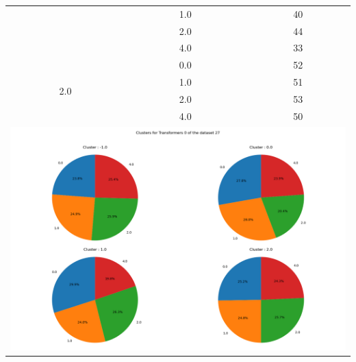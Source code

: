 \begin{longtable}{|c|c|c|c|c|}
& \multicolumn{2}{c|}{1.0} & \multicolumn{2}{c|}{40} \\
& \multicolumn{2}{c|}{2.0} & \multicolumn{2}{c|}{44} \\
& \multicolumn{2}{c|}{4.0} & \multicolumn{2}{c|}{33} \\
\hline
\multirow{4}{*}{2.0} & \multicolumn{2}{c|}{0.0} & \multicolumn{2}{c|}{52} \\
& \multicolumn{2}{c|}{1.0} & \multicolumn{2}{c|}{51} \\
& \multicolumn{2}{c|}{2.0} & \multicolumn{2}{c|}{53} \\
& \multicolumn{2}{c|}{4.0} & \multicolumn{2}{c|}{50} \\
\hline
\multicolumn{5}{|c|}{\includegraphics[width=0.8\linewidth]{img/annexes/27/clustering_pie_charts/Transformers 0.png}} \\
\end{longtable}


